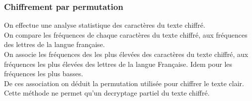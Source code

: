 \documentclass{article}
\begin{document}
\subsubsection{Chiffrement par permutation}
\vspace{1\baselineskip}

On effectue une analyse statistique des caractères du texte chiffré. \\
On compare les fréquences de chaque caractères du texte chiffré, aux fréquences des lettres de la langue française. \\
On associe les fréquences des les plus élevées des caractères du texte chiffré, aux fréquences les plus élevées des lettres de la langue Française. Idem pour les fréquences les plus basses. \\
De ces association on déduit la permutation utilisée pour chiffrer le texte clair. \\
Cette méthode ne permet qu'un decryptage partiel du texte chiffré. \\
\vspace{2\baselineskip}
\end{document}

